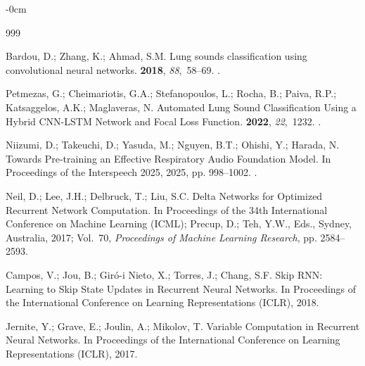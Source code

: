 \documentclass[algorithms,article,submit,pdftex,oneauthor]{Definitions/mdpi}
\begin{document}
\begin{adjustwidth}{-\extralength}{0cm}
\begin{thebibliography}{999}

Bardou, D.; Zhang, K.; Ahmad, S.M.
\newblock Lung sounds classification using convolutional neural networks.
 {\bf 2018}, {\em
  88},~58--69.
.

Petmezas, G.; Cheimariotis, G.A.; Stefanopoulos, L.; Rocha, B.; Paiva, R.P.;
  Katsaggelos, A.K.; Maglaveras, N.
\newblock Automated Lung Sound Classification Using a Hybrid {CNN-LSTM} Network
  and Focal Loss Function.
 {\bf 2022}, {\em 22},~1232.
.

Niizumi, D.; Takeuchi, D.; Yasuda, M.; Nguyen, B.T.; Ohishi, Y.; Harada, N.
\newblock Towards Pre-training an Effective Respiratory Audio Foundation Model.
\newblock In Proceedings of the Interspeech 2025,  2025, pp. 998--1002.
.

Neil, D.; Lee, J.H.; Delbruck, T.; Liu, S.C.
\newblock Delta Networks for Optimized Recurrent Network Computation.
\newblock In Proceedings of the 34th International Conference on Machine
  Learning (ICML); Precup, D.; Teh, Y.W., Eds., Sydney, Australia,  2017;
  Vol.~70, {\em Proceedings of Machine Learning Research}, pp. 2584--2593.

Campos, V.; Jou, B.; Gir{\'o}-i Nieto, X.; Torres, J.; Chang, S.F.
\newblock Skip {RNN}: Learning to Skip State Updates in Recurrent Neural
  Networks.
\newblock In Proceedings of the International Conference on Learning
  Representations (ICLR),  2018.

Jernite, Y.; Grave, E.; Joulin, A.; Mikolov, T.
\newblock Variable Computation in Recurrent Neural Networks.
\newblock In Proceedings of the International Conference on Learning
  Representations (ICLR),  2017.


\end{thebibliography}
\end{adjustwidth}
\end{document}
